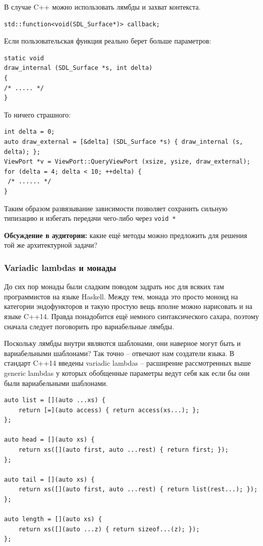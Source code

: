 \documentclass[a4paper,12pt,oneside]{article}
\begin{document}
В случае C++ можно использовать лямбды и захват контекста.

\begin{lstlisting}
std::function<void(SDL_Surface*)> callback;
\end{lstlisting}

Если пользовательская функция реально берет больше параметров:

\begin{lstlisting}
static void
draw_internal (SDL_Surface *s, int delta)
{
/* ..... */
}
\end{lstlisting}

То ничего страшного:

\begin{lstlisting}
int delta = 0;
auto draw_external = [&delta] (SDL_Surface *s) { draw_internal (s, delta); };
ViewPort *v = ViewPort::QueryViewPort (xsize, ysize, draw_external);
for (delta = 4; delta < 10; ++delta) {
 /* ...... */
}
\end{lstlisting}

Таким образом развязывание зависимости позволяет сохранить сильную типизацию и избегать передачи чего-либо через \lstinline!void *!

\textbf{Обсуждение в аудитории:} какие ещё методы можно предложить для решения той же архитектурной задачи?

\subsubsection{Variadic lambdas и монады}

До сих пор монады были сладким поводом задрать нос для всяких там программистов на языке Haskell. Между тем, монада это просто моноид на категории эндофункторов и такую простую вещь вполне можно нарисовать и на языке C++14. Правда понадобится ещё немного синтаксического сахара, поэтому сначала следует поговорить про вариабельные лямбды.

Поскольку лямбды внутри являются шаблонами, они наверное могут быть и вариабельными шаблонами? Так точно -- отвечают нам создатели языка. В стандарт C++14 введены variadic lambdas -- расширение рассмотренных выше generic lambdas у которых обобщенные параметры ведут себя как если бы они были вариабельными шаблонами.

\begin{lstlisting}
auto list = [](auto ...xs) {
    return [=](auto access) { return access(xs...); };
};

auto head = [](auto xs) {
    return xs([](auto first, auto ...rest) { return first; });
};

auto tail = [](auto xs) {
    return xs([](auto first, auto ...rest) { return list(rest...); });
};

auto length = [](auto xs) {
    return xs([](auto ...z) { return sizeof...(z); });
};
\end{lstlisting}
\end{document}
